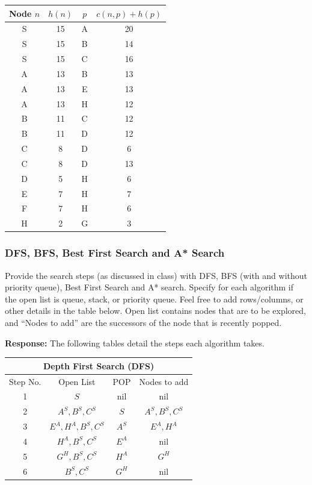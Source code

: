 \documentclass[12pt, letterpaper]{article}
\newcommand{\mybox}[1]{\par\noindent\colorbox{shadecolor}
{\parbox{\dimexpr\textwidth-2\fboxsep\relax}{#1}}}
\begin{document}
\begin{center}
    \begin{tabular}{|c|c|c|c|} 
    \hline
    Node $n$ & $h(n)$ & $p$ & $c(n,p)+h(p)$ \tabularnewline
    \hline
    S & 15 & A & 20\tabularnewline
    \hline
    \rowcolor{red}S & 15 & B & 14\tabularnewline
    \hline
    S & 15 & C & 16\tabularnewline
    \hline
    A & 13 & B & 13\tabularnewline
    \hline
    A & 13 & E & 13\tabularnewline
    \hline
    \rowcolor{red}A & 13 & H & 12\tabularnewline
    \hline
    B & 11 & C & 12\tabularnewline
    \hline
    B & 11 & D & 12\tabularnewline
    \hline
    \rowcolor{red}C & 8 & D & 6\tabularnewline
    \hline
    C & 8 & D & 13\tabularnewline
    \hline
    D & 5 & H & 6\tabularnewline
    \hline
    E & 7 & H & 7\tabularnewline
    \hline
    \rowcolor{red}F & 7 & H & 6\tabularnewline
    \hline
    H & 2 & G & 3\tabularnewline
    \hline

    \end{tabular}
\end{center}

\subsubsection{DFS, BFS, Best First Search and A* Search}
\mybox{Provide the search steps (as discussed in class) with DFS, BFS (with and without priority
queue), Best First Search and A* search. Specify for each algorithm if the open list is
queue, stack, or priority queue. Feel free to add rows/columns, or other details in the
table below. Open list contains nodes that are to be explored, and “Nodes to add” are
the successors of the node that is recently popped.}

\textbf{Response:} The following tables detail the steps each algorithm takes.

\begin{center}
    \begin{tabular}{|c|c|c|c|}
    \hline
    \multicolumn{4}{|c|}{Depth First Search (\textbf{DFS})}\\
    \hline
    Step No. & Open List & POP & Nodes to add \\ 
    \hline
    1 & $S$ & nil & nil \\
    \hline
    2 & $A^S, B^S, C^S$ & $S$ & $A^S, B^S, C^S$ \\
    \hline
    3 & $E^A, H^A, B^S, C^S$ & $A^S$ & $E^A,H^A$ \\
    \hline
    4 & $H^A, B^S, C^S$ & $E^A$ & nil\\
    \hline
    5 & $G^H,B^S,C^S$ & $H^A$ & $G^H$ \\
    \hline
    6 & $B^S,C^S$ & $G^H$ & nil \\
    \hline
    \end{tabular}
\end{center}
\end{document}
